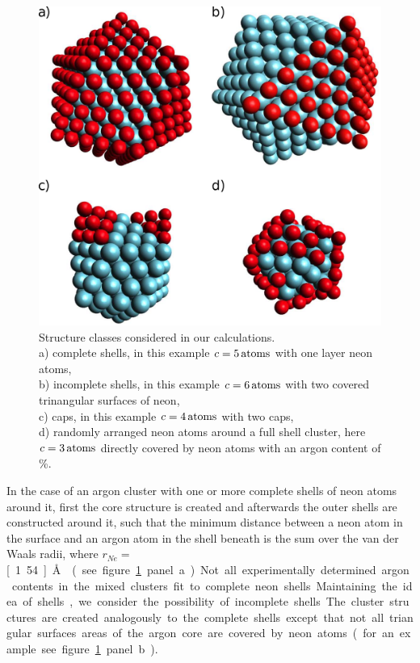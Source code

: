 \begin{figure}[!h]
 \centering
 \includegraphics[scale=0.9]{pics/NeAr_structures1.eps}
 \caption{Structure classes considered in our calculations.\\
          a) complete shells, in this example $c=\unit[5]{atoms}$ with one layer
          neon atoms,\\
          b) incomplete shells, in this example
          $c=\unit[6]{atoms}$ with two covered trinangular surfaces
          of neon,\\
          c) caps, in this example $c=\unit[4]{atoms}$ with two caps,\\
          d) randomly arranged neon atoms around a full shell cluster,
          here $c=\unit[3]{atoms}$ directly covered by neon atoms
          with an argon content of \unit[47]{\%}.}
 \label{figure:structures}
\end{figure}

In the case of an argon cluster with one or more complete shells of neon
atoms around it, first the core structure is created and afterwards the
outer shells are constructed around it, such that the minimum distance between a
neon atom in the surface and an argon atom in the shell beneath is the sum
over the van der Waals radii, where $r_{Ne}=$\unit[1.54]{\AA} \cite{Bondi64}
(see figure \ref{figure:structures} panel a).

Not all experimentally determined argon contents in the mixed clusters
fit to complete neon shells. Maintaining the idea of shells,
we consider the possibility of incomplete shells.
The cluster structures are created analogously to the
complete shells except that not all triangular surfaces areas of the argon core
are covered by neon atoms (for an example see figure \ref{figure:structures}
panel b).

